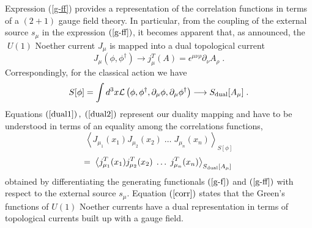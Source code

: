 \documentclass[a4paper,12pt]{article}
\begin{document}
Expression (\ref{g-ff}) provides a representation of the
correlation functions in terms of a $%
(2+1) $ gauge field theory. In particular, from the coupling of the
external source $s_\mu $ in the expression $\left( {\rm
    {\ref{g-ff}}}\right) $, it becomes apparent that, as announced,
the$\;U(1)$ Noether current $J_\mu $ is mapped into a dual topological
current
\begin{equation}
\label{dual1}
J_\mu (\phi ,\phi ^{\dagger })\longrightarrow j_\mu^T (A)=\epsilon^{\mu \nu \rho }\partial _\nu A_\rho \;.
\end{equation}
Correspondingly, for the classical action we have
\begin{equation}
\label{dual2}
S[\phi]=\int d^3x {\cal L}\left( \phi ,\phi ^{\dagger },\partial _\mu  \phi
,\partial _\mu \phi ^{\dagger }\right)\longrightarrow S_{{\rm dual}}[A_\mu]\;.
\end{equation}
Equations $\left( {\rm {\ref{dual1}}}\right) ,\;\left( {\rm {\ref{dual2}}}%
\right) \;$represent our duality mapping and have to be understood in
terms of an equality among the correlations functions,
$$
\left\langle J_{\mu _1}(x_1)J_{\mu
    _2}(x_2)\;\ldots\;J_{\mu _n}(x_n)\right\rangle _{S[\phi]}
$$
\begin{equation}
 \label{corr}
=\;\left\langle j_{\mu _1}^T(x_1)j_{\mu _2}^T(x_2)\;\ldots\;
j_{\mu_n}^T(x_n)\right\rangle _{S_{{\rm dual}}[A_\mu]}\;
\end{equation}
obtained by differentiating the generating functionals $\left( {\rm
    {\ref {g-f}}}\right) $ and $\left( {\rm {\ref{g-ff}}}\right) $
with respect to the external source $s_\mu $. Equation $\left( {\rm
    {\ref{corr}}}\right) $ states that the Green's functions of $U(1)$
Noether currents have a dual representation in terms of topological
currents built up with a gauge field.
\end{document}
